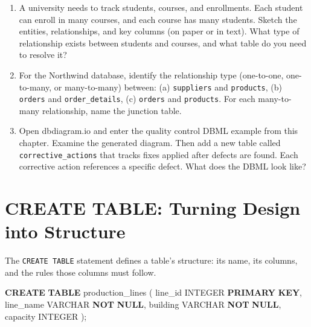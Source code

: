 \documentclass[
  letterpaper,
  DIV=11,
  numbers=noendperiod]{scrreprt}
\newenvironment{Shaded}{\begin{snugshade}}{\end{snugshade}}
\newcommand{\DataTypeTok}[1]{\textcolor[rgb]{0.68,0.00,0.00}{#1}}
\newcommand{\KeywordTok}[1]{\textcolor[rgb]{0.00,0.23,0.31}{\textbf{#1}}}
\newcommand{\NormalTok}[1]{\textcolor[rgb]{0.00,0.23,0.31}{#1}}
\begin{document}
\begin{tcolorbox}[enhanced jigsaw, opacitybacktitle=0.6, arc=.35mm, colback=white, bottomtitle=1mm, opacityback=0, toprule=.15mm, left=2mm, colbacktitle=quarto-callout-note-color!10!white, breakable, coltitle=black, toptitle=1mm, colframe=quarto-callout-note-color-frame, bottomrule=.15mm, titlerule=0mm, title=\textcolor{quarto-callout-note-color}{\faInfo}\hspace{0.5em}{Exercises}, rightrule=.15mm, leftrule=.75mm]

\begin{enumerate}
\def\labelenumi{\arabic{enumi}.}
\item
  A university needs to track students, courses, and enrollments. Each
  student can enroll in many courses, and each course has many students.
  Sketch the entities, relationships, and key columns (on paper or in
  text). What type of relationship exists between students and courses,
  and what table do you need to resolve it?
\item
  For the Northwind database, identify the relationship type
  (one-to-one, one-to-many, or many-to-many) between: (a)
  \texttt{suppliers} and \texttt{products}, (b) \texttt{orders} and
  \texttt{order\_details}, (c) \texttt{orders} and \texttt{products}.
  For each many-to-many relationship, name the junction table.
\item
  Open dbdiagram.io and enter the quality control DBML example from this
  chapter. Examine the generated diagram. Then add a new table called
  \texttt{corrective\_actions} that tracks fixes applied after defects
  are found. Each corrective action references a specific defect. What
  does the DBML look like?
\end{enumerate}

\end{tcolorbox}

\section{CREATE TABLE: Turning Design into
Structure}\label{create-table-turning-design-into-structure}

The \texttt{CREATE\ TABLE} statement defines a table's structure: its
name, its columns, and the rules those columns must follow.

\begin{codelisting}

\caption{\texttt{duckdb}}

\begin{Shaded}
\begin{Highlighting}[]
\KeywordTok{CREATE} \KeywordTok{TABLE}\NormalTok{ production\_lines (}
\NormalTok{    line\_id     }\DataTypeTok{INTEGER} \KeywordTok{PRIMARY} \KeywordTok{KEY}\NormalTok{,}
\NormalTok{    line\_name   }\DataTypeTok{VARCHAR} \KeywordTok{NOT} \KeywordTok{NULL}\NormalTok{,}
\NormalTok{    building    }\DataTypeTok{VARCHAR} \KeywordTok{NOT} \KeywordTok{NULL}\NormalTok{,}
\NormalTok{    capacity    }\DataTypeTok{INTEGER}
\NormalTok{);}
\end{Highlighting}
\end{Shaded}

\end{codelisting}
\end{document}
